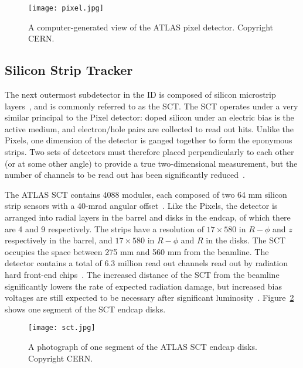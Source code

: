 
\begin{figure}
\centering
\texttt{[image: pixel.jpg]}
\label{fig:detector:pixel}
\caption{A computer-generated view of the ATLAS pixel detector. Copyright CERN.}
\end{figure}




\subsection{Silicon Strip Tracker}

The next outermost subdetector in the ID is composed of silicon microstrip layers~\cite{ATLASPaper}, and is commonly referred to as the SCT.  The SCT operates under a very similar principal to the Pixel detector: doped silicon under an electric bias is the active medium, and electron/hole pairs are collected to read out hits. Unlike the Pixels, one dimension of the detector is ganged together to form the eponymous strips. Two sets of detectors must therefore placed perpendicularly to each other (or at some other angle) to provide a true two-dimensional measurement, but the number of channels to be read out has been significantly reduced~\cite{Detectors}.

The ATLAS SCT contains 4088 modules, each composed of two 64 mm silicon strip sensors with a 40-mrad angular offset~\cite{ATLASPaper}. Like the Pixels, the detector is arranged into radial layers in the barrel and disks in the endcap, of which there are 4 and 9 respectively. The strips have a resolution of $17 \times 580$ in $R-\phi$ and $z$ respectively in the barrel, and $17 \times 580$ in $R-\phi$ and $R$ in the disks. The SCT occupies the space between 275 mm and 560 mm from the beamline. The detector contains a total of 6.3 million read out channels read out by radiation hard front-end chips~\cite{SCTPaper}. The increased distance of the SCT from the beamline significantly lowers the rate of expected radiation damage, but increased bias voltages are still expected to be necessary after significant luminosity~\cite{ATLASPaper}.  Figure~\ref{fig:detector:sct} shows one segment of the SCT endcap disks.



\begin{figure}
\centering
\texttt{[image: sct.jpg]}
\label{fig:detector:sct}
\caption{A photograph of one segment of the ATLAS SCT endcap disks. Copyright CERN.}
\end{figure}

